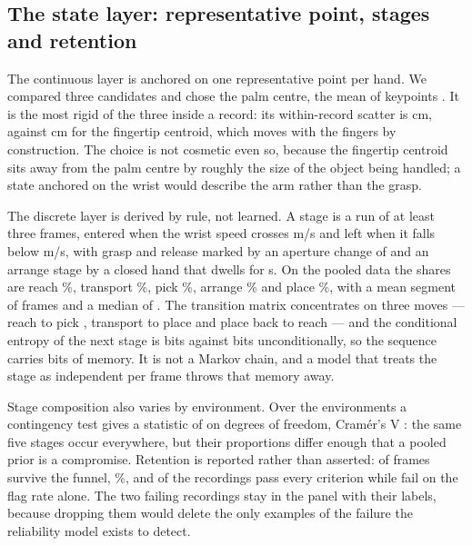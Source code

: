 \documentclass{swmcmthesis}
\begin{document}
\subsection{The state layer: representative point, stages and retention}
\label{sec:p1state}

The continuous layer is anchored on one representative point per hand. We compared
three candidates and chose the palm centre, the mean of keypoints \slotPalmKeypoints{}. It is the most rigid of the three inside a record: its within-record scatter is
\slotPStateRepPalmResidCm{} cm, against \slotPStateRepTipCm{} cm for the fingertip
centroid, which moves with the fingers by construction. The choice is not cosmetic
even so, because the fingertip centroid sits away from the palm centre by roughly the
size of the object being handled; a state anchored on the wrist would describe the
arm rather than the grasp.

The discrete layer is derived by rule, not learned. A stage is a run of at least
three frames, entered when the wrist speed crosses \slotVHigh{} m/s and left when it
falls below \slotVLow{} m/s, with grasp and release marked by an aperture change of
\slotAGrasp{} and an arrange stage by a closed hand that dwells for \slotTArrange{}
s. On the pooled data the shares are reach \slotPStateShareReach{}\%, transport
\slotPStateShareTransport{}\%, pick \slotPStateSharePick{}\%, arrange
\slotPStateShareArrange{}\% and place \slotPStateSharePlace{}\%, with a mean segment
of \slotPStateMeanSegLen{} frames and a median of \slotPStateMedSegLen{}. The
transition matrix concentrates on three moves --- reach to pick
\slotPStateTransReachPick{}, transport to place \slotPStateTransTransportPlace{} and
place back to reach \slotPStateTransPlaceReach{} --- and the conditional entropy of
the next stage is \slotPStateHCond{} bits against \slotPStateHNext{} bits
unconditionally, so the sequence carries \slotPStateInfoBits{} bits of memory. It is
not a Markov chain, and a model that treats the stage as independent per frame
throws that memory away.

Stage composition also varies by environment. Over the \slotNEnv{} environments a
contingency test gives a statistic of \slotPStateChiTwo{} on \slotPStateDof{}
degrees of freedom, Cram\'er's V \slotPStateCramerV{}: the same five stages occur
everywhere, but their proportions differ enough that a pooled prior is a compromise.
Retention is reported rather than asserted: \slotPStateRetFrames{} of
\slotPStateRetTotal{} frames survive the funnel, \slotPStateRetRate{}\%, and
\slotPStatePassN{} of the \slotNRecords{} recordings pass every criterion while
\slotPStateFailN{} fail on the flag rate alone. The two failing recordings stay in
the panel with their labels, because dropping them would delete the only examples of
the failure the reliability model exists to detect.
\end{document}
